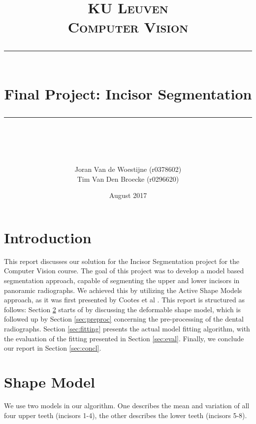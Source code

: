 \documentclass[a4paper,titlepage,12pt]{article}
\begin{document}
 
\newcommand{\horrule}[1]{\rule{\linewidth}{#1}}     %

\title{
        \normalfont \normalsize \textsc{KU Leuven} \\ [25pt]
        \normalfont \normalsize \textsc{Computer Vision} 
        \horrule{2pt} \\[0.5cm]
        \huge Final Project: Incisor Segmentation \\
        \horrule{2pt} \\[0.5cm]
}
\author{
        \normalfont            
        Joran Van de Woestijne (r0378602)\\
        Tim Van Den Broecke (r0296620)
}
\date{August 2017}
 
\maketitle

\newpage
\tableofcontents
\thispagestyle{empty}
\newpage
\setcounter{page}{1}

\section{Introduction}

This report discusses our solution for the Incisor Segmentation project for the Computer Vision course.
The goal of this project was to develop a model based segmentation approach, capable of segmenting the upper and lower incisors in panoramic radiographs.
We achieved this by utilizing the Active Shape Models approach, as it was first presented by Cootes et al \cite{cootes2000introduction}.
This report is structured as follows: 
Section \ref{sec:shape} starts of by discussing the deformable shape model, which is followed up by Section \ref{sec:preproc} concerning the pre-processing of the dental radiographs. Section \ref{sec:fitting} presents the actual model fitting algorithm, with the evaluation of the fitting presented in Section \ref{sec:eval}.
Finally, we conclude our report in Section \ref{sec:concl}.

\section{Shape Model}
\label{sec:shape}
We use two models in our algorithm. One describes the mean and variation of all four upper teeth (incisors 1-4), the other describes the lower teeth (incisors 5-8). 
\end{document}
